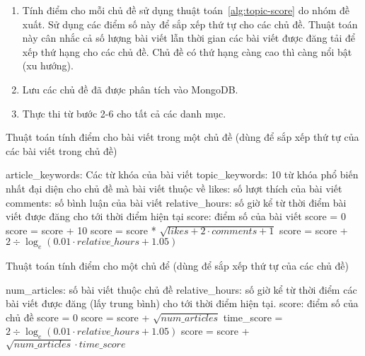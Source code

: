\begin{enumerate}
\begin{enumerate}
    \end{enumerate}
    \item Tính điểm cho mỗi chủ đề sử dụng thuật toán~\ref{alg:topic-score} do nhóm đề xuất. Sử dụng các điểm số này để sắp xếp thứ tự cho các chủ đề. Thuật toán này cân nhắc cả số lượng bài viết lẫn thời gian các bài viết được đăng tải để xếp thứ hạng cho các chủ đề. Chủ đề có thứ hạng càng cao thì càng nổi bật (xu hướng).
    \item Lưu các chủ đề đã được phân tích vào MongoDB.
    \item Thực thi từ bước 2-6 cho tất cả các danh mục.
\end{enumerate}

\begin{algorithm}[ht!]
    \caption{Thuật toán tính điểm cho bài viết trong một chủ đề (dùng để sắp xếp thứ tự của các bài viết trong chủ đề)}\label{alg:article-score}
    \begin{algorithmic}[1]
\Require article\_keywords: Các từ khóa của bài viết
\Require topic\_keywords: 10 từ khóa phổ biến nhất đại diện cho chủ đề mà bài viết thuộc về
\Require likes: số lượt thích của bài viết
\Require comments: số bình luận của bài viết
\Require relative\_hours: số giờ kể từ thời điểm bài viết được đăng cho tới thời điểm hiện tại
\Ensure score: điểm số của bài viết
\State score = 0
        score = score + 10
    \EndIf
\EndFor
\State score = score * $\sqrt{likes + 2 \cdot comments + 1}$
\State score = score + $2 \div \log_{e}(0.01 \cdot relative\_hours + 1.05)$
    \end{algorithmic}
\end{algorithm}

\begin{algorithm}[ht!]
    \caption{Thuật toán tính điểm cho một chủ để (dùng để sắp xếp thứ tự của các chủ đề)}\label{alg:topic-score}
    \begin{algorithmic}[1]
\Require num\_articles: số bài viết thuộc chủ đề
\Require relative\_hours: số giờ kể từ thời điểm các bài viết được đăng (lấy trung bình) cho tới thời điểm hiện tại.
\Ensure score: điểm số của chủ đề
\State score = 0
\State score = score + $\sqrt{num\_articles}$
\State time\_score = $2 \div \log_{e}(0.01 \cdot relative\_hours + 1.05)$
\State score = score + $\sqrt{num\_articles} \cdot time\_score$
    \end{algorithmic}
\end{algorithm}

